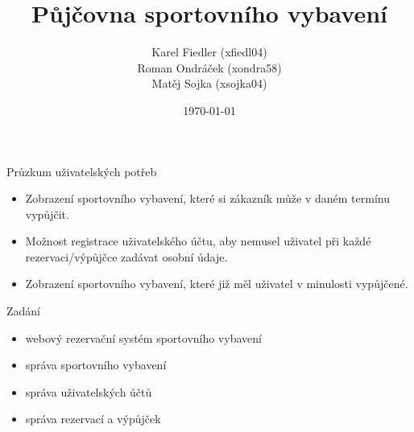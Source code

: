 \documentclass[11pt]{beamer}
\author[Tým xfiedl04]{Karel Fiedler (xfiedl04)\\Roman Ondráček (xondra58)\\Matěj Sojka (xsojka04)}
\title{Půjčovna sportovního vybavení}
\institute[]{Fakulta informačních technologií VUT v Brně}
\date{\today}
\begin{document}
	\begin{frame}
		\titlepage
	\end{frame}
	\begin{frame}{Průzkum uživatelských potřeb}
		\begin{itemize}
			\item Zobrazení sportovního vybavení, které si zákazník může v daném termínu vypůjčit.
			\item Možnost registrace uživatelského účtu, aby nemusel uživatel při každé rezervaci/výpůjčce zadávat osobní údaje.
			\item Zobrazení sportovního vybavení, které již měl uživatel v minulosti vypůjčené.
		\end{itemize}
	\end{frame}
	\begin{frame}{Zadání}
		\begin{itemize}
			\item webový rezervační systém sportovního vybavení
			\item správa sportovního vybavení
			\item správa uživatelských účtů
			\item správa rezervací a výpůjček
		\end{itemize}
	\end{frame}
\end{document}
